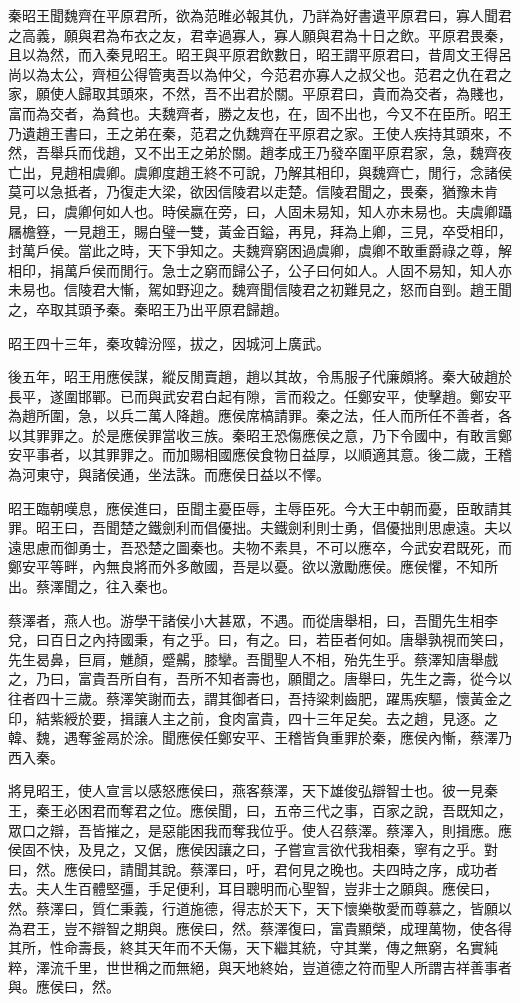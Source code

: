 秦昭王聞魏齊在平原君所，欲為范睢必報其仇，乃詳為好書遺平原君曰，寡人聞君之高義，願與君為布衣之友，君幸過寡人，寡人願與君為十日之飲。平原君畏秦，且以為然，而入秦見昭王。昭王與平原君飲數日，昭王謂平原君曰，昔周文王得呂尚以為太公，齊桓公得管夷吾以為仲父，今范君亦寡人之叔父也。范君之仇在君之家，願使人歸取其頭來，不然，吾不出君於關。平原君曰，貴而為交者，為賤也，富而為交者，為貧也。夫魏齊者，勝之友也，在，固不出也，今又不在臣所。昭王乃遺趙王書曰，王之弟在秦，范君之仇魏齊在平原君之家。王使人疾持其頭來，不然，吾舉兵而伐趙，又不出王之弟於關。趙孝成王乃發卒圍平原君家，急，魏齊夜亡出，見趙相虞卿。虞卿度趙王終不可說，乃解其相印，與魏齊亡，閒行，念諸侯莫可以急抵者，乃復走大梁，欲因信陵君以走楚。信陵君聞之，畏秦，猶豫未肯見，曰，虞卿何如人也。時侯嬴在旁，曰，人固未易知，知人亦未易也。夫虞卿躡屩檐簦，一見趙王，賜白璧一雙，黃金百鎰，再見，拜為上卿，三見，卒受相印，封萬戶侯。當此之時，天下爭知之。夫魏齊窮困過虞卿，虞卿不敢重爵祿之尊，解相印，捐萬戶侯而閒行。急士之窮而歸公子，公子曰何如人。人固不易知，知人亦未易也。信陵君大慚，駕如野迎之。魏齊聞信陵君之初難見之，怒而自剄。趙王聞之，卒取其頭予秦。秦昭王乃出平原君歸趙。

昭王四十三年，秦攻韓汾陘，拔之，因城河上廣武。

後五年，昭王用應侯謀，縱反閒賣趙，趙以其故，令馬服子代廉頗將。秦大破趙於長平，遂圍邯鄲。已而與武安君白起有隙，言而殺之。任鄭安平，使擊趙。鄭安平為趙所圍，急，以兵二萬人降趙。應侯席槁請罪。秦之法，任人而所任不善者，各以其罪罪之。於是應侯罪當收三族。秦昭王恐傷應侯之意，乃下令國中，有敢言鄭安平事者，以其罪罪之。而加賜相國應侯食物日益厚，以順適其意。後二歲，王稽為河東守，與諸侯通，坐法誅。而應侯日益以不懌。

昭王臨朝嘆息，應侯進曰，臣聞主憂臣辱，主辱臣死。今大王中朝而憂，臣敢請其罪。昭王曰，吾聞楚之鐵劍利而倡優拙。夫鐵劍利則士勇，倡優拙則思慮遠。夫以遠思慮而御勇士，吾恐楚之圖秦也。夫物不素具，不可以應卒，今武安君既死，而鄭安平等畔，內無良將而外多敵國，吾是以憂。欲以激勵應侯。應侯懼，不知所出。蔡澤聞之，往入秦也。

蔡澤者，燕人也。游學干諸侯小大甚眾，不遇。而從唐舉相，曰，吾聞先生相李兌，曰百日之內持國秉，有之乎。曰，有之。曰，若臣者何如。唐舉孰視而笑曰，先生曷鼻，巨肩，魋顏，蹙齃，膝攣。吾聞聖人不相，殆先生乎。蔡澤知唐舉戲之，乃曰，富貴吾所自有，吾所不知者壽也，願聞之。唐舉曰，先生之壽，從今以往者四十三歲。蔡澤笑謝而去，謂其御者曰，吾持粱刺齒肥，躍馬疾驅，懷黃金之印，結紫綬於要，揖讓人主之前，食肉富貴，四十三年足矣。去之趙，見逐。之韓、魏，遇奪釜鬲於涂。聞應侯任鄭安平、王稽皆負重罪於秦，應侯內慚，蔡澤乃西入秦。

將見昭王，使人宣言以感怒應侯曰，燕客蔡澤，天下雄俊弘辯智士也。彼一見秦王，秦王必困君而奪君之位。應侯聞，曰，五帝三代之事，百家之說，吾既知之，眾口之辯，吾皆摧之，是惡能困我而奪我位乎。使人召蔡澤。蔡澤入，則揖應。應侯固不快，及見之，又倨，應侯因讓之曰，子嘗宣言欲代我相秦，寧有之乎。對曰，然。應侯曰，請聞其說。蔡澤曰，吁，君何見之晚也。夫四時之序，成功者去。夫人生百體堅彊，手足便利，耳目聰明而心聖智，豈非士之願與。應侯曰，然。蔡澤曰，質仁秉義，行道施德，得志於天下，天下懷樂敬愛而尊慕之，皆願以為君王，豈不辯智之期與。應侯曰，然。蔡澤復曰，富貴顯榮，成理萬物，使各得其所，性命壽長，終其天年而不夭傷，天下繼其統，守其業，傳之無窮，名實純粹，澤流千里，世世稱之而無絕，與天地終始，豈道德之符而聖人所謂吉祥善事者與。應侯曰，然。

